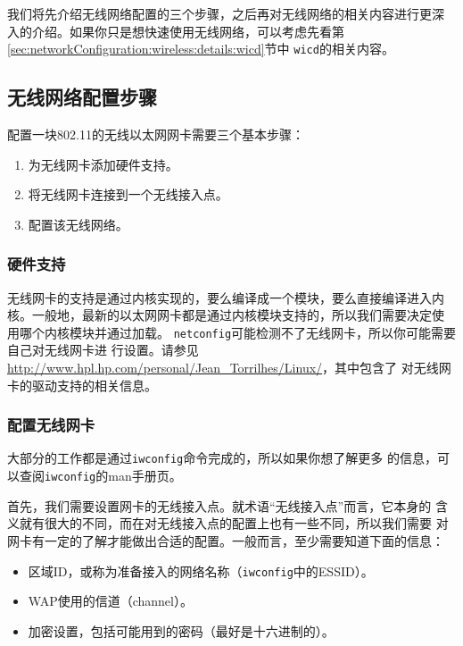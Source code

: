 我们将先介绍无线网络配置的三个步骤，之后再对无线网络的相关内容进行更深
入的介绍。如果你只是想快速使用无线网络，可以考虑先看第
\ref{sec:networkConfiguration:wireless:details:wicd}节中
\texttt{wicd}的相关内容。

\subsection{无线网络配置步骤}
\label{sec:networkConfiguration:wireless:setup}

配置一块802.11的无线以太网网卡需要三个基本步骤：
\begin{enumerate}
\item 为无线网卡添加硬件支持。
\item 将无线网卡连接到一个无线接入点。
\item 配置该无线网络。
\end{enumerate}

\subsubsection{硬件支持}
\label{sec:networkConfiguration:wireless:setup:hardwareSupport}
无线网卡的支持是通过内核实现的，要么编译成一个模块，要么直接编译进入内
核。一般地，最新的以太网网卡都是通过内核模块支持的，所以我们需要决定使
用哪个内核模块并通过加载。
\texttt{netconfig}可能检测不了无线网卡，所以你可能需要自己对无线网卡进
行设置。请参见
\url{http://www.hpl.hp.com/personal/Jean_Torrilhes/Linux/}，其中包含了
对无线网卡的驱动支持的相关信息。

\subsubsection{配置无线网卡}
\label{sec:networkConfiguration:wireless:setup:configWireless}
大部分的工作都是通过\texttt{iwconfig}命令完成的，所以如果你想了解更多
的信息，可以查阅\texttt{iwconfig}的man手册页。

首先，我们需要设置网卡的无线接入点。就术语“无线接入点”而言，它本身的
含义就有很大的不同，而在对无线接入点的配置上也有一些不同，所以我们需要
对网卡有一定的了解才能做出合适的配置。一般而言，至少需要知道下面的信息：
\begin{itemize}
\item 区域ID，或称为准备接入的网络名称（\texttt{iwconfig}中的ESSID）。
\item WAP使用的信道（channel）。
\item 加密设置，包括可能用到的密码（最好是十六进制的）。
\end{itemize}

